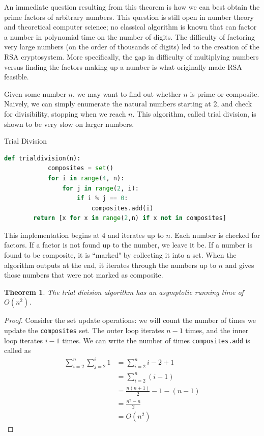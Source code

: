 \documentclass{amsart}
\newtheorem{thm}{Theorem}
\theoremstyle{definition}
\theoremstyle{case}
\begin{document}
	An immediate question resulting from this theorem is how we can best obtain the prime factors of arbitrary numbers. This question is still open in number theory and theoretical computer science; no classical algorithm is known that can factor a number in polynomial time on the number of digits. The difficulty of factoring very large numbers (on the order of thousands of digits) led to the creation of the RSA cryptosystem. More specifically, the gap in difficulty of multiplying numbers versus finding the factors making up a number is what originally made RSA feasible.
	
	Given some number $n$, we may want to find out whether $n$ is prime or composite. Naively, we can simply enumerate the natural numbers starting at 2, and check for divisibility, stopping when we reach $n$. This algorithm, called trial division, is shown to be very slow on larger numbers.
	
	\begin{Algorithm}[H]\caption{Trial Division}
		\begin{lstlisting}[language=Python]
		def trialdivision(n):
		    composites = set()
		    for i in range(4, n):
		        for j in range(2, i):
		            if i % j == 0:
		                composites.add(i)
		return [x for x in range(2,n) if x not in composites]
		\end{lstlisting}
	\end{Algorithm}
	
	This implementation begins at 4 and iterates up to $n$. Each number is checked for factors. If a factor is not found up to the number, we leave it be. If a number is found to be composite, it is ``marked" by collecting it into a set. When the algorithm outputs at the end, it iterates through the numbers up to $n$ and gives those numbers that were not marked as composite.
	
	\begin{thm}
		The trial division algorithm has an asymptotic running time of $O(n^2)$.
	\end{thm}
	\begin{proof}
		Consider the set update operations: we will count the number of times we update the \texttt{composites} set. The outer loop iterates $n-1$ times, and the inner loop iterates $i-1$ times. We can write the number of times \texttt{composites.add} is called as
		\begin{equation*}
		\begin{split}
		\sum_{i=2}^{n} \sum_{j=2}^{i} 1 & = \sum_{i=2}^{n} i-2+1 \\
		& = \sum_{i=2}^{n} (i-1) \\
		& = \frac{n(n+1)}{2} - 1 - (n-1) \\
		& = \frac{n^2 - n}{2} \\
		& = O(n^2)
		\end{split}
		\end{equation*}
	\end{proof}
	
\end{document}
